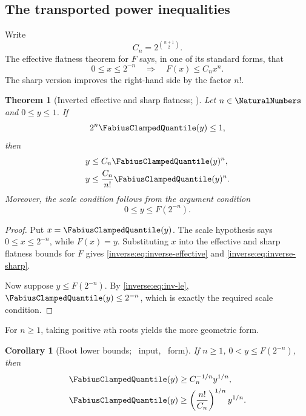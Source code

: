 \documentclass[11pt,oneside]{article}
\newtheorem{theorem}{Theorem}[section]
\newtheorem{corollary}[corollary]{Corollary}
\theoremstyle{definition}
\theoremstyle{remark}
\begin{document}
\subsection{The transported power inequalities}

Write
\[
 C_n=2^{\binom{n+1}{2}}.
\]
The effective flatness theorem for $F$ says, in one of its standard forms,
that
\[
 0\leq x\leq2^{-n}
 \quad\Longrightarrow\quad
 F(x)\leq C_nx^n. \label{inverse:eq:flatness-input}
\]
The sharp version improves the right-hand side by the factor $n!$.

\begin{theorem}[Inverted effective and sharp flatness; \Formalized]
\label{inverse:thm:inverted-flatness}
Let $n\in\NaturalNumbers$ and $0\leq y\leq1$.  If
\[
 2^n\FabiusClampedQuantile(y)\leq1,
\]
then
\begin{align}
 y&\leq C_n\FabiusClampedQuantile(y)^n, \label{inverse:eq:inverse-effective}\\
 y&\leq \frac{C_n}{n!}\FabiusClampedQuantile(y)^n. \label{inverse:eq:inverse-sharp}
\end{align}
Moreover, the scale condition follows from the argument condition
\[
 0\leq y\leq F(2^{-n}).
\]
\end{theorem}

\begin{proof}
Put $x=\FabiusClampedQuantile(y)$.  The scale hypothesis says $0\leq x\leq2^{-n}$, while
$F(x)=y$.  Substituting $x$ into the effective and sharp flatness bounds
for $F$ gives \eqref{inverse:eq:inverse-effective} and
\eqref{inverse:eq:inverse-sharp}.

Now suppose $y\leq F(2^{-n})$.  By
\eqref{inverse:eq:inv-le}, $\FabiusClampedQuantile(y)\leq2^{-n}$, which is exactly the required
scale condition.
\end{proof}

For $n\geq1$, taking positive $n$th roots yields the more geometric form.

\begin{corollary}[Root lower bounds; \Formalized\ input, \Derived\ form]
\label{inverse:cor:root-lower}
If $n\geq1$, $0<y\leq F(2^{-n})$, then
\begin{align}
 \FabiusClampedQuantile(y)&\geq C_n^{-1/n}y^{1/n}, \label{inverse:eq:root-effective}\\
 \FabiusClampedQuantile(y)&\geq
 \left(\frac{n!}{C_n}\right)^{1/n}y^{1/n}. \label{inverse:eq:root-sharp}
\end{align}
\end{corollary}
\end{document}
